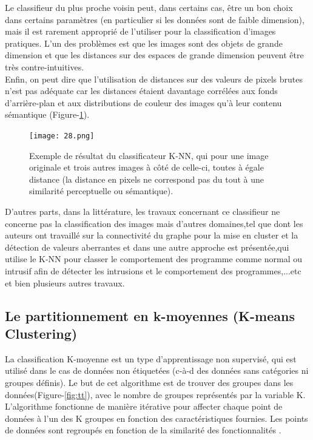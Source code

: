 Le classifieur du plus proche voisin peut, dans certains cas, être un bon choix dans certains paramètres (en particulier si les données sont de faible dimension), mais il est rarement approprié de l'utiliser pour la classification d'images pratiques. L’un des problèmes est que les images sont des objets de grande dimension et que les distances sur des espaces de grande dimension peuvent être très contre-intuitives.\\ 
Enfin, on peut dire que l’utilisation de distances sur des valeurs de pixels brutes n’est pas adéquate car les distances étaient davantage corrélées aux fonds d’arrière-plan et aux distributions de couleur des images qu’à leur contenu sémantique (Figure-\ref{fig:20}).
\begin{figure}[h!]
      \centering
      \texttt{[image: 28.png]}
      \caption{Exemple de résultat du classificateur K-NN, qui pour une image originale et trois autres images à côté de celle-ci, toutes à égale distance (la distance en pixels ne correspond pas du tout à une similarité perceptuelle ou sémantique).}
    \label{fig:20}
\end{figure}

D’autres parts, dans la littérature, les travaux concernant ce classifieur ne concerne pas la classification des images mais d’autres domaines,tel que \cite{25} dont les auteurs ont travaillé sur la connectivité du graphe pour la mise en cluster et la détection de valeurs aberrantes et dans \cite{26} une autre approche est présentée,qui utilise le K-NN pour classer le comportement des programme comme normal ou intrusif afin de détecter les intrusions et le comportement des programmes,...etc et bien plusieurs autres travaux.

\subsection{Le partitionnement en k-moyennes (K-means Clustering)}

La classification K-moyenne est un type d'apprentissage non supervisé, qui est utilisé dans le cas de données non étiquetées (c-à-d des données sans catégories ni groupes définis). Le but de cet algorithme est de trouver des groupes dans les données(Figure-\ref{fig:tt}), avec le nombre de groupes représentés par la variable K. L’algorithme fonctionne de manière itérative pour affecter chaque point de données à l’un des K groupes en fonction des caractéristiques fournies. Les points de données sont regroupés en fonction de la similarité des fonctionnalités \cite{27}.\\

